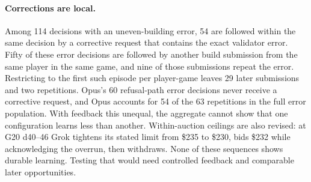 \paragraph{Corrections are local.} Among 114 decisions with an uneven-building error, 54 are followed within the same decision by a corrective request that contains the exact validator error. Fifty of these error decisions are followed by another build submission from the same player in the same game, and nine of those submissions repeat the error. Restricting to the first such episode per player-game leaves 29 later submissions and two repetitions. Opus's 60 refusal-path error decisions never receive a corrective request, and Opus accounts for 54 of the 63 repetitions in the full error population. With feedback this unequal, the aggregate cannot show that one configuration learns less than another. Within-auction ceilings are also revised: at G20 d40--46 Grok tightens its stated limit from \$235 to \$230, bids \$232 while acknowledging the overrun, then withdraws. None of these sequences shows durable learning. Testing that would need controlled feedback and comparable later opportunities.

\FloatBarrier
